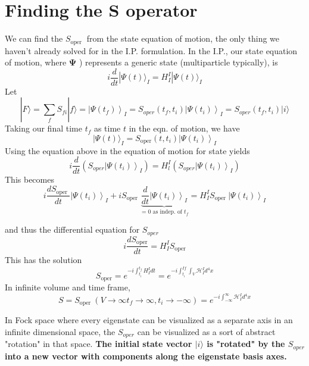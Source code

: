 \section{Finding the S operator}
We can find the $S_{\text {oper }}$ from the state equation of motion, the only thing we haven't already solved for in the I.P. formulation. In the I.P., our state equation of motion, where $\mathbf{\Psi}$ ) represents a generic state (multiparticle typically), is
$$
i \frac{d}{d t}|\Psi(t)\rangle_{I}=H_{I}^{I}|\Psi(t)\rangle_{I}
$$
Let
\begin{equation}
|F\rangle=\sum_{f} S_{f i}|f\rangle=\left|\Psi\left(t_{f}\right)\right\rangle_{I}=S_{o p e r}\left(t_{f}, t_{i}\right)\left|\Psi\left(t_{i}\right)\right\rangle_{I}=S_{o p e r}\left(t_{f}, t_{i}\right)|i\rangle
\end{equation}
Taking our final time $t_f$ as time $t$ in the eqn. of motion, we have
\begin{equation}
|\Psi(t)\rangle_{I}=S_{\text {oper}}\left(t, t_{i}\right)\left|\Psi\left(t_{i}\right)\right\rangle_{I}
\end{equation}
Using the equation  above in the equation of motion for state yields
\begin{equation}
i \frac{d}{d t}\left(S_{o p e r}\left|\Psi\left(t_{i}\right)\right\rangle_{I}\right)=H_{l}^{I}\left(S_{o p e r}\left|\Psi\left(t_{i}\right)\right\rangle_{I}\right)
\end{equation}
This becomes
\begin{equation}
i \frac{d S_{\text {oper }}}{d t}\left|\Psi\left(t_{i}\right)\right\rangle_{I}+i S_{\text {oper }}\underbrace{ \frac{d}{d t}\left|\Psi\left(t_{i}\right)\right\rangle_{I}}_{=0\text{ as indep. of }t_f}=H_{I}^{I} S_{\text {oper }}\left|\Psi\left(t_{i}\right)\right\rangle_{I}
\end{equation}
\begin{qt}
and thus the differential equation for $S_{oper}$
\begin{equation}
i \frac{d S_{\text {oper}}}{d t}=H_{I}^{I} S_{\text {oper}}
\end{equation}
This has the solution
\begin{equation}
S_{\text {oper}}=e^{-i \int_{t_{i}}^{t_{f}} H_{I}^{I} d t}=e^{-i \int_{t_{i}}^{I f} \int_{V} \mathcal{H}_{I}^{I} d^{4} x}
\end{equation}
In infinite volume and time frame,
\begin{equation}
S=S_{\text {oper }}\left(V\rightarrow\infty t_{f} \rightarrow \infty, t_{i} \rightarrow-\infty\right)=e^{-i \int_{-\infty}^{\infty} \mathcal{H}_{I}^{I} d^{4} x}
\label{S-oper}
\end{equation}
\end{qt}
\begin{mybox}
In Fock space where every eigenstate can be visualized as a separate axis in an infinite dimensional space, the $S_{oper}$ can be visualized as a sort of abstract "rotation" in that space. \textbf{The initial state vector $|i\rangle$ is "rotated" by the $S_{oper}$ into a new vector with components along the eigenstate basis axes.}
\end{mybox}
